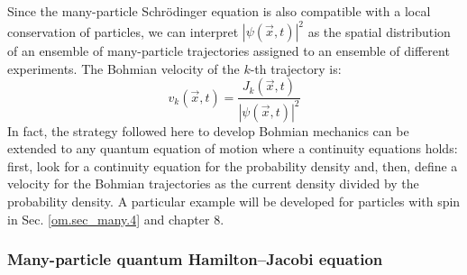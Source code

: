\documentclass[nofootinbib, secnumarabic, amsmath, nobibnotes,11pt,aps,pra, floatfix]{revtex4-1}
\newcommand{\sref}[1]{Sec. \ref{#1}}
\begin{document}
Since the many-particle Schr\"odinger equation is also compatible with a local conservation of particles, we can interpret $|\psi(\vec{x},t)|^2$ as the spatial distribution of an ensemble of many-particle trajectories assigned to an ensemble of different experiments. The Bohmian velocity of the $k$-th trajectory is:
\begin{equation}
\label{om.velocityND}
v_k(\vec{x},t) = \frac{J_k(\vec{x},t)} {|\psi(\vec{x},t)|^2}
\end{equation}
In fact, the strategy followed here to develop Bohmian mechanics can be extended to any quantum equation of motion where a continuity equations holds: first, look for a continuity equation for the probability density and, then, define a velocity for the Bohmian trajectories as the current density divided by the probability density.
A particular example will be developed for particles with spin in \sref{om.sec_many.4} and chapter 8.

\subsubsection{Many-particle quantum Hamilton--Jacobi equation}
\end{document}
